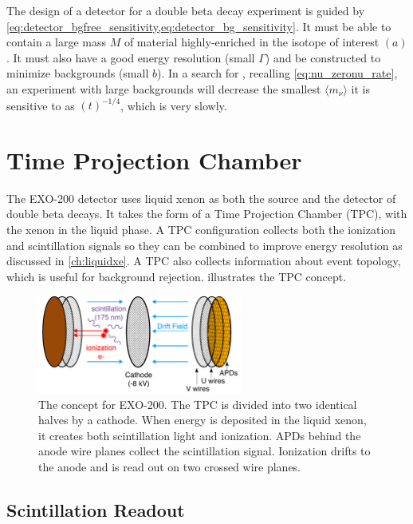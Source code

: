 \documentclass[herrin-thesis.tex]{subfiles}
\begin{document}
The design of a detector for a double beta decay experiment is guided by \cref{eq:detector_bgfree_sensitivity,eq:detector_bg_sensitivity}. It must be able to contain a large mass \(M\) of material highly-enriched in the isotope of interest \((a)\). It must also have a good energy resolution (small \(\Gamma\)) and be constructed to minimize backgrounds (small \(b\)). In a search for \zeronu{}, recalling \cref{eq:nu_zeronu_rate}, an experiment with large backgrounds will decrease the smallest  \(\langle m_{\nu} \rangle\) it is sensitive to as \((t)^{-1/4}\), which is very slowly.

\section{Time Projection Chamber}
The EXO-200 detector uses liquid xenon as both the source and the detector of double beta decays. It takes the form of a Time Projection Chamber (TPC), with the xenon in the liquid phase. A TPC configuration collects both the ionization and scintillation signals so they can be combined to improve energy resolution as discussed in \cref{ch:liquidxe}. A TPC also collects information about event topology, which is useful for background rejection.  illustrates the TPC concept.
\begin{figure}
\centering
\includegraphics[width=0.6\textwidth]{./figures/detector_tpc_schematic.pdf}
\caption[A conceptual drawing of EXO-200]{The concept for EXO-200. The TPC is divided into two identical halves by a cathode. When energy is deposited in the liquid xenon, it creates both scintillation light and ionization. APDs behind the anode wire planes collect the scintillation signal. Ionization drifts to the anode and is read out on two crossed wire planes.}
\label{fig:detector_tpc_cartoon}
\end{figure}

\subsection{Scintillation Readout}
\end{document}
